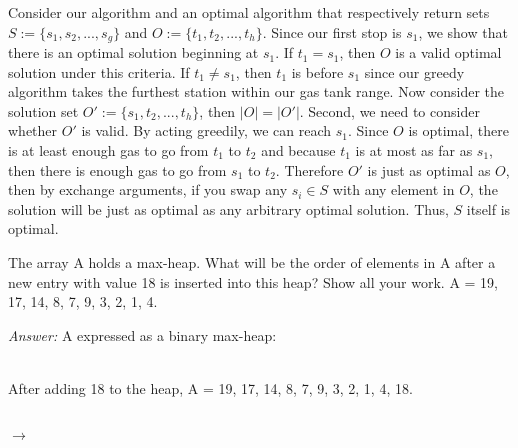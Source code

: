 \documentclass[12pt]{article}
\newenvironment{problem}[2][Problem]{\begin{trivlist}
\item[\hskip \labelsep {\bfseries #1}\hskip \labelsep {\bfseries #2.}]}{\end{trivlist}}
\begin{document}
Consider our algorithm and an optimal algorithm that respectively return sets $S:=\{s_1,s_2,...,s_g\}$ and $O:=\{t_1,t_2,...,t_h\}$. Since our first stop is $s_1$, we show that there is an optimal solution beginning at $s_1$. If $t_1 = s_1$, then $O$ is a valid optimal solution under this criteria. If $t_1\neq s_1$, then $t_1$ is before $s_1$ since our greedy algorithm takes the furthest station within our gas tank range. Now consider the solution set $O':=\{s_1,t_2,...,t_h\}$, then $|O|=|O'|$. Second, we need to consider whether $O'$ is valid. By acting greedily, we can reach $s_1$. Since $O$ is optimal, there is at least enough gas to go from $t_1$ to $t_2$ and because $t_1$ is at most as far as $s_1$, then there is enough gas to go from $s_1$ to $t_2$. Therefore $O'$ is just as optimal as $O$, then by exchange arguments, if you swap any $s_i \in S$ with any element in $O$, the solution will be just as optimal as any arbitrary optimal solution. Thus, $S$ itself is optimal.
\begin{problem}{2}
The array A holds a max-heap. What will be the order of elements in A after a new entry with value 18 is inserted into this heap? Show all your work. A = 19, 17, 14, 8, 7, 9, 3, 2, 1, 4.
\end{problem}
\textit{Answer:}
A expressed as a binary max-heap:\\
\\After adding 18 to the heap, A = 19, 17, 14, 8, 7, 9, 3, 2, 1, 4, 18.\\
\\
$\rightarrow$
\end{document}
